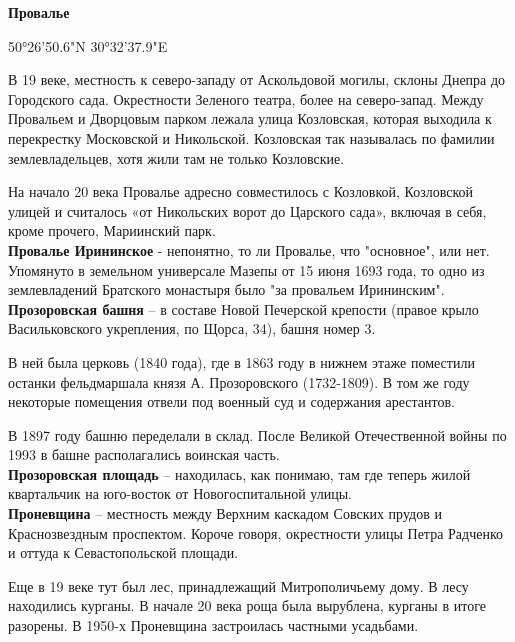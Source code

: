 \textbf{Провалье} 

50°26'50.6"N 30°32'37.9"E

В 19 веке, местность к северо-зап\-аду от Аскольдовой могилы, склоны Днепра до Городского сада. Окрестности Зеленого театра, более на северо-запад. Между Провальем и Дворцовым парком лежала улица Козловская, которая выходила к перекрестку Московской и Никольской. Козловская так называлась по фамилии землевладельцев, хотя жили там не только Козловские.

На начало 20 века Провалье адресно совместилось с Козловкой, Козловской улицей и считалось «от Никольских ворот до Царского сада», включая в себя, кроме прочего, Мариинский парк.\\

\textbf{Провалье Ирининское} - непонятно, то ли Провалье, что "основное", или нет. Упомянуто в земельном универсале Мазепы от 15 июня 1693 года, то одно из землевладений Братского монастыря было "за провальем Ирининским".\\


\textbf{Прозоровская башня} – в составе Новой Печерской крепости (правое крыло Васильковского укрепления, по Щорса, 34), башня номер 3.

В ней была церковь (1840 года), где в 1863 году в нижнем этаже поместили останки фельдмаршала князя А. Прозоровского (1732-1809). В том же году некоторые помещения отвели под военный суд и содержания арестантов.

В 1897 году башню переделали в склад. После Великой Отечественной войны по 1993 в башне располагались воинская часть.\\


\textbf{Прозоровская площадь} – находилась, как понимаю, там где теперь жилой квартальчик на юго-восток от Новогоспитальной улицы.\\

\textbf{Проневщина} – местность между Верхним каскадом Совских прудов и Краснозвездным проспектом. Короче говоря, окрестности улицы Петра Радченко и оттуда к Севастопольской площади.

Еще в 19 веке тут был лес, принадлежащий Митрополичьему дому. В лесу находились курганы. В начале 20 века роща была вырублена, курганы в итоге разорены. В 1950-х Проневщина застроилась частными усадьбами.

